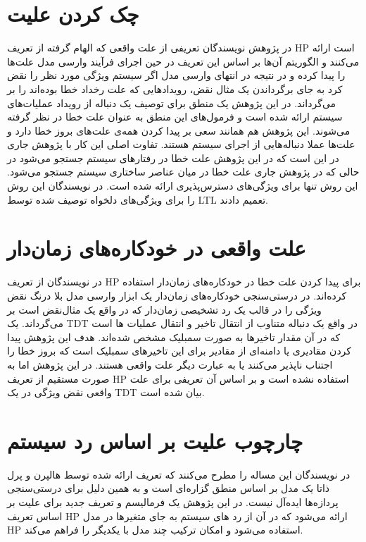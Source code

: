 \section{چک کردن علیت}
در پژوهش 
\cite{causality-checking}
نویسندگان تعریفی از علت‌ واقعی که الهام گرفته از تعریف 
HP
است ارائه می‌کنند و الگوریتم آن‌ها بر اساس این تعریف در حین اجرای فرآیند وارسی مدل%
علت‌ها را پیدا کرده و در نتیجه در انتهای وارسی مدل اگر سیستم ویژگی مورد نظر را نقض کرد به جای برگرداندن یک مثال نقض، رویداد‌هایی که علت رخداد خطا بوده‌اند را بر می‌گرداند.
در این پژوهش یک منطق برای توصیف یک دنباله از رویداد عملیات‌های سیستم ارائه شده است و فرمول‌های این منطق به عنوان علت خطا در نظر گرفته می‌شوند. 
این پژوهش هم همانند
\cite{chockler}
سعی بر پیدا کردن همه‌ی علت‌های بروز خطا دارد و علت‌ها عملا دنباله‌هایی از اجرای سیستم هستند. 
تفاوت اصلی این کار با پژوهش جاری در این است که در این پژوهش علت خطا در رفتارهای سیستم جستجو می‌شود در حالی که در پژوهش جاری علت خطا در میان عناصر ساختاری سیستم جستجو می‌شود.
این روش تنها برای ویژگی‌های دسترس‌پذیری ارائه شده است.
در
\cite{Caltais-LTL}
نویسندگان این روش‌ را برای ویژگی‌های دلخواه توصیف شده توسط
LTL
تعمیم دادند.

\section{علت واقعی در خودکاره‌های زمان‌دار}
در
\cite{kolbl2020dynamic}
نویسندگان از تعریف 
HP
برای پیدا کردن علت خطا در خودکاره‌های زمان‌دار%
استفاده کرده‌اند.
در درستی‌سنجی خودکاره‌های زمان‌دار یک ابزار وارسی مدل بلا درنگ نقض ویژگی‌ را در قالب یک رد تشخیصی زمان‌دار %
که در واقع یک مثال‌نقض است بر می‌گرداند.
یک 
TDT
در واقع یک دنباله متناوب از انتقال تاخیر%
و
انتقال عملیات%
ها است که در آن مقدار تاخیر‌ها به صورت سمبلیک مشخص شده‌اند.
هدف این پژوهش پیدا کردن مقادیری یا دامنه‌ای از مقادیر برای این تاخیر‌های سمبلیک است که بروز خطا را اجتناب ناپذیر می‌کنند یا به عبارت دیگر علت واقعی هستند.
در این پژوهش اما به صورت مستقیم از تعریف 
HP
استفاده نشده است و بر اساس آن تعریفی برای علت واقعی نقض ویژگی در یک 
TDT
بیان شده است.

\section{چارچوب علیت بر اساس رد سیستم}
در 
\cite{gossler2013general}
نویسندگان این مساله را مطرح می‌کنند که تعریف ارائه شده توسط هالپرن و پرل ذاتا یک مدل بر اساس منطق گزاره‌ای%
است و به همین دلیل برای درستی‌سنجی پردازه‌ها ایده‌آل نیست.
در این پژوهش یک فرمالیسم و تعریف جدید برای علیت بر اساس تعریف 
HP
ارائه می‌شود که در آن از رد‌%
های سیستم به جای متغیر‌ها در مدل 
HP
استفاده می‌شود و امکان ترکیب%
چند مدل با یکدیگر را فراهم می‌کند.


